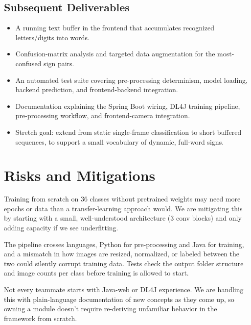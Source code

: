 \documentclass[12pt,a4paper]{article}
\begin{document}
\subsection{Subsequent Deliverables}

\begin{itemize}[leftmargin=*]

  \item A running text buffer in the frontend that accumulates recognized letters/digits into
  words.

  \item Confusion-matrix analysis and targeted data augmentation for the most-confused sign
  pairs.

  \item An automated test suite covering pre-processing determinism, model loading, backend
  prediction, and frontend-backend integration.

  \item Documentation explaining the Spring Boot wiring, DL4J training pipeline, pre-processing
  workflow, and frontend-camera integration.

  \item Stretch goal: extend from static single-frame classification to short buffered
  sequences, to support a small vocabulary of dynamic, full-word signs.

\end{itemize}


\section{Risks and Mitigations}

Training from scratch on 36 classes without pretrained weights may need more epochs or data
than a transfer-learning approach would. We are mitigating this by starting with a small,
well-understood architecture (3 conv blocks) and only adding capacity if we see underfitting.

The pipeline crosses languages, Python for pre-processing and Java for training, and a mismatch
in how images are resized, normalized, or labeled between the two could silently corrupt
training data. Tests check the output folder structure and image counts per class before training
is allowed to start.

Not every teammate starts with Java-web or DL4J experience. We are handling this with
plain-language documentation of new concepts as they come up, so owning a module doesn't
require re-deriving unfamiliar behavior in the framework from scratch.
\end{document}
